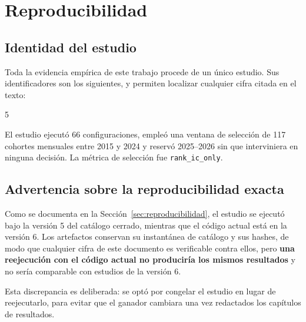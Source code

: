 \chapter{Reproducibilidad}
\label{anexo:reproducibilidad}

\section{Identidad del estudio}

Toda la evidencia empírica de este trabajo procede de un único estudio. Sus identificadores son los
siguientes, y permiten localizar cualquier cifra citada en el texto:

\begin{description}[leftmargin=3.2cm,style=nextline,font=\normalfont\ttfamily]
  \item[study\_id] \studyid
  \item[winner\_run\_id] 
  \item[dataset\_hash] 
  \item[evaluation\_key] 
  \item[catalog\_hash] 
  \item[catalog\_version] 5
\end{description}

El estudio ejecutó 66 configuraciones, empleó una ventana de selección de 117 cohortes mensuales
entre 2015 y 2024 y reservó 2025--2026 sin que interviniera en ninguna decisión. La métrica de
selección fue \texttt{rank\_ic\_only}.

\section{Advertencia sobre la reproducibilidad exacta}

Como se documenta en la Sección~\ref{sec:reproducibilidad}, el estudio se ejecutó bajo la versión 5
del catálogo cerrado, mientras que el código actual está en la versión 6. Los artefactos conservan
su instantánea de catálogo y sus hashes, de modo que cualquier cifra de este documento es
verificable contra ellos, pero \textbf{una reejecución con el código actual no produciría los mismos
resultados} y no sería comparable con estudios de la versión 6.

Esta discrepancia es deliberada: se optó por congelar el estudio en lugar de reejecutarlo, para
evitar que el ganador cambiara una vez redactados los capítulos de resultados.

